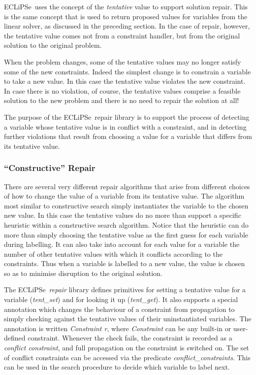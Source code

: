 \documentclass[a4wide]{article}
\newcommand{\ECL}{\mbox{ECLiPSe\ }{\hspace{1mm}}}
\begin{document}
\ECL uses the concept of the {\em tentative} value to
support solution repair.  
This is the same concept that is used to return proposed values for
variables from the linear solver, as discussed in the preceding
section.
In the case of repair, however, the tentative value comes not from a
constraint handler, but from the original solution to the original
problem.

When the problem changes, some of the tentative values may no longer
satisfy some of the new constraints.
Indeed the simplest change is to constrain a variable to take a new
value. 
In this case the tentative value violates the new constraint.
In case there is no violation, of course, the tentative values
comprise a feasible solution to the new problem and there is no need
to repair the solution at all!

The purpose of the \ECL repair library is to support the process of
detecting a variable whose tentative value is in conflict with a
constraint, and in detecting further violations that result from
choosing a value for a variable that differs from its tentative value.

\subsubsection{``Constructive'' Repair}
There are several very different repair algorithms that arise from
different choices of how to change the value of a variable from its
tentative value.
The algorithm most similar to constructive search simply instantiates
the variable to the chosen new value.
In this case the tentative values do no more than support a specific
heuristic within a constructive search algorithm.
Notice that the heuristic can do more than simply choosing the
tentative value as the first guess for each variable during labelling.
It can also take into account for each value for a variable the number
of other tentative values with which it conflicts according to the
constraints.
Thus when a variable is labelled to a new value, the value is chosen
so as to minimise disruption to the original solution.

The \ECL {\em repair} library defines primitives for setting a
tentative value for a variable ({\em tent\_set}) and for looking it up
({\em tent\_get}).
It also supports a special annotation which 
changes the behaviour of a constraint from propagation to simply
checking against the
tentative values of their uninstantiated variables. 
The annotation is written {\em Constraint r}, where {\em Constraint}
can be any built-in or user-defined constraint.
Whenever the check fails, the constraint is recorded as a {\em
conflict constraint}, and full propagation on the constraint is
switched on.
The set of conflict constraints can be accessed via the predicate {\em
conflict\_constraints}.
This can be used in the search procedure to decide which variable to
label next.
\end{document}
